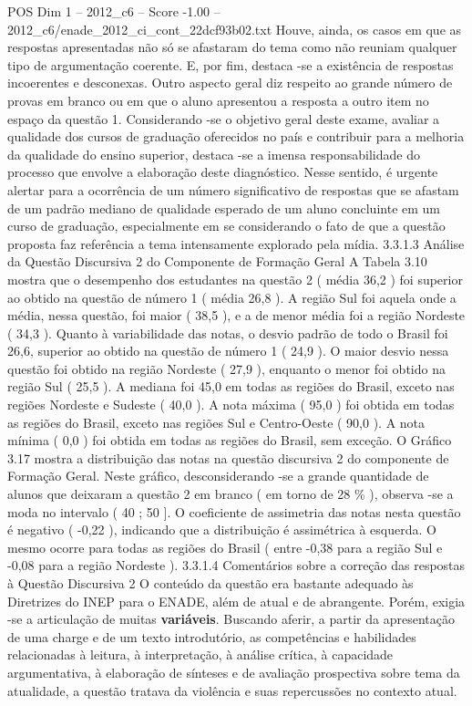 \begin{textsample}{POS Dim 1 – 2012\_c6 – Score -1.00 – 2012\_c6/enade\_2012\_ci\_cont\_22dcf93b02.txt}
Houve, ainda, os casos em que as respostas apresentadas não só se afastaram do tema como não reuniam qualquer tipo de argumentação coerente.
E, por fim, destaca -se a existência de respostas incoerentes e desconexas.
Outro aspecto geral diz respeito ao grande número de provas em branco ou em que o aluno apresentou a resposta a outro item no espaço da questão 1.
Considerando -se o objetivo geral deste exame, avaliar a qualidade dos cursos de graduação oferecidos no país e contribuir para a melhoria da qualidade do ensino superior, destaca -se a imensa responsabilidade do processo que envolve a elaboração deste diagnóstico.
Nesse sentido, é urgente alertar para a ocorrência de um número significativo de respostas que se afastam de um padrão mediano de qualidade esperado de um aluno concluinte em um curso de graduação, especialmente em se considerando o fato de que a questão proposta faz referência a tema intensamente explorado pela mídia. 3.3.1.3 Análise da Questão Discursiva 2 do Componente de Formação Geral A Tabela 3.10 mostra que o desempenho dos estudantes na questão 2 ( média 36,2 ) foi superior ao obtido na questão de número 1 ( média 26,8 ).
A região Sul foi aquela onde a média, nessa questão, foi maior ( 38,5 ), e a de menor média foi a região Nordeste ( 34,3 ).
Quanto à variabilidade das notas, o desvio padrão de todo o Brasil foi 26,6, superior ao obtido na questão de número 1 ( 24,9 ).
O maior desvio nessa questão foi obtido na região Nordeste ( 27,9 ), enquanto o menor foi obtido na região Sul ( 25,5 ).
A mediana foi 45,0 em todas as regiões do Brasil, exceto nas regiões Nordeste e Sudeste ( 40,0 ).
A nota máxima ( 95,0 ) foi obtida em todas as regiões do Brasil, exceto nas regiões Sul e Centro-Oeste ( 90,0 ).
A nota mínima ( 0,0 ) foi obtida em todas as regiões do Brasil, sem exceção.
O Gráfico 3.17 mostra a distribuição das notas na questão discursiva 2 do componente de Formação Geral.
Neste gráfico, desconsiderando -se a grande quantidade de alunos que deixaram a questão 2 em branco ( em torno de 28 \% ), observa -se a moda no intervalo ( 40 ; 50 ].
O coeficiente de assimetria das notas nesta questão é negativo ( -0,22 ), indicando que a distribuição é assimétrica à esquerda.
O mesmo ocorre para todas as regiões do Brasil ( entre -0,38 para a região Sul e -0,08 para a região Nordeste ). 3.3.1.4 Comentários sobre a correção das respostas à Questão Discursiva 2 O conteúdo da questão era bastante adequado às Diretrizes do INEP para o ENADE, além de atual e de abrangente.
Porém, exigia -se a articulação de muitas \textbf{variáveis}.
Buscando aferir, a partir da apresentação de uma charge e de um texto introdutório, as competências e habilidades relacionadas à leitura, à interpretação, à análise crítica, à capacidade argumentativa, à elaboração de sínteses e de avaliação prospectiva sobre tema da atualidade, a questão tratava da violência e suas repercussões no contexto atual.

\end{textsample}
